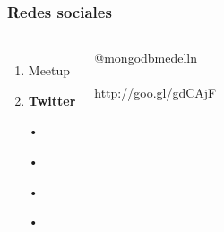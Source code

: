 \documentclass{beamer}
\begin{document}
\begin{frame}
\frametitle{Redes sociales}
\begin{columns}[c] %

\begin{enumerate}
\item Meetup
\item \textbf{Twitter}
\item[•]	
\item[•]	
\item[•]	
\item[•]	
\end{enumerate}

{\color{blue}@mongodbmedelln}
\\~\\
{\color{blue}\url{http://goo.gl/gdCAjF}}
\end{columns}
\end{frame}
\end{document}

